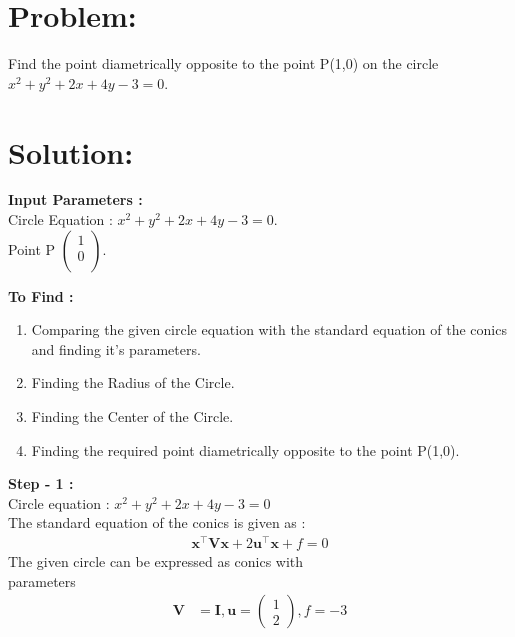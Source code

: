 \documentclass[10pt,a4paper]{report}
\newcommand{\myvec}[1]{\ensuremath{\begin{pmatrix}#1\end{pmatrix}}}
\let\vec\mathbf
\begin{document}
\begin{multicols}{2}

\section{Problem:}  
Find the point diametrically opposite to the point P(1,0) on the circle $x^2+y^2+2x+4y-3=0$.

\section{Solution: }
\raggedright \textbf{Input Parameters :}\\ \vspace{2mm}
\centering Circle Equation : $x^2+y^2+2x+4y-3=0$. \\ \vspace{1mm}
Point P $\begin{pmatrix}
  1\\
  0\\
 \end{pmatrix}$.\\
\vspace{3mm}

\raggedright \textbf{To Find :}\\ \vspace{2mm}
\begin{enumerate}
\item Comparing the given circle equation with the standard equation of the conics and finding it's parameters.
\item Finding the Radius of the Circle.
\item Finding the Center of the Circle.
\item Finding the required point diametrically opposite to the point P(1,0).
\end{enumerate}

\raggedright \textbf{Step - 1 :}\\ \vspace{2mm}
Circle equation : $x^2+y^2+2x+4y-3=0$\\ \vspace{1mm}
The standard equation of the conics is given as :
\begin{align}
\vec{x}^{\top}\vec{V}\vec{x}+2\vec{u}^{\top}\vec{x}+f=0
\end{align}
The given circle  can be expressed as conics with \\parameters
\begin{align}
	\vec{V} &= \vec{I}, \vec{u} = \myvec{1 \\2}, f = -3
	\end{align}


\end{multicols}
\end{document}
